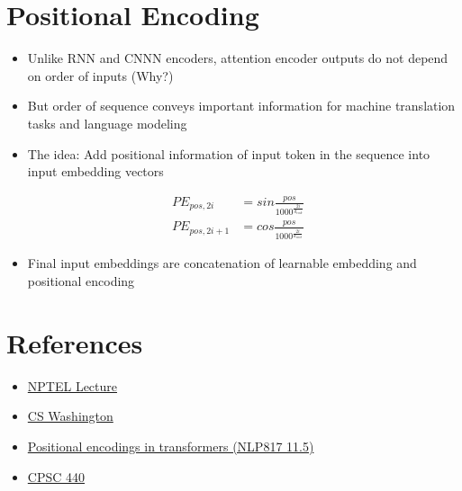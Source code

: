 \documentclass{article}
\begin{document}
\section{Positional Encoding}
\begin{itemize}
    \item Unlike RNN and CNNN encoders, attention encoder outputs do not depend on order of inputs (Why?)
    \item But order of sequence conveys important information for machine translation tasks and language modeling
    \item The idea: Add positional information of input token in the sequence into input embedding vectors
\end{itemize}
\begin{align*}
    &PE_{pos,2i}   &= sin \frac{pos}{1000^{\frac{2i}{d_{emb}}}} \\
    &PE_{pos,2i+1} &= cos \frac{pos}{1000^{\frac{2i}{d_{emb}}}}
\end{align*}
\begin{itemize}
    \item Final input embeddings are concatenation of learnable embedding and positional encoding
\end{itemize}
\section{References}
\begin{itemize}
    \item \href{https://www.youtube.com/watch?v=phOc25QfNS0&t=55s}{NPTEL Lecture}
    \item \href{https://courses.cs.washington.edu/courses/cse543/22sp/schedule/lecture15_transformer.pdf}{CS Washington}
    \item \href{https://www.youtube.com/watch?v=5V9gZcAd6cE}{Positional encodings in transformers (NLP817 11.5)}
    \item \href{https://www.cs.ubc.ca/~schmidtm/Courses/440-W22/L20.pdf}{CPSC 440}
\end{itemize}
\end{document}
